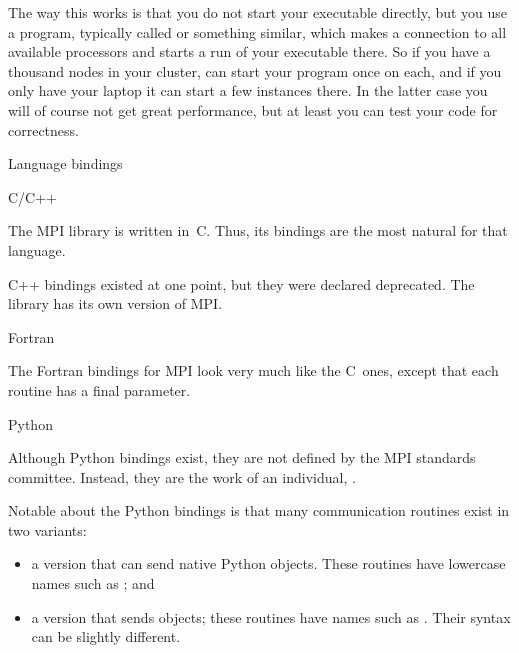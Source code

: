 The way this works is that you do not start your executable directly,
but you use a program, typically called  or
something similar, which makes a connection to all available
processors and starts a run of your executable there. So if you have a
thousand nodes in your cluster,  can start your program once
on each, and if you only have your laptop it can start a few instances
there. In the latter case you will of course not get great
performance, but at least you can test your code for correctness.

 {Language bindings}

 {C/C++}

The MPI library is written in~C. Thus, its bindings are the most natural
for that language.

C++ bindings existed at one point, but they were declared deprecated.
The  library has its own version of MPI.


 {Fortran}


The Fortran bindings for MPI look very much like the C~ones, except that
each routine has a final  parameter.


 {Python}


Although Python bindings exist, they are not defined by the MPI
standards committee. Instead, they are the work of an individual,
.

Notable about the Python bindings is that many communication routines
exist in two variants:
\begin{itemize}
\item a version that can send native Python objects. These routines
  have lowercase names such as ; and
\item a version that sends  objects; these routines
  have names such as . Their syntax can be slightly different.
\end{itemize}


